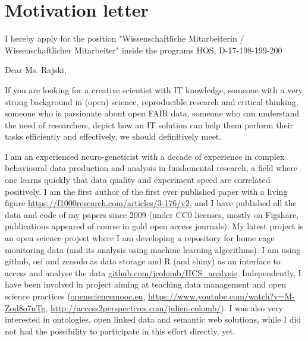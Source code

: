 \section* {Motivation letter}

I hereby apply for the position "Wissenschaftliche Mitarbeiterin / Wissenschaftlicher Mitarbeiter" inside the programs HOS, D-17-198-199-200
\vspace {0.5cm} 

Dear Ms. Rajski,

If you are looking for a creative scientist with IT knowledge, someone with a very strong background in (open) science, reproducible research and critical thinking, someone who is passionate about open FAIR data, someone who can understand the need of researchers, depict how an IT solution can help them perform their tasks efficiently and effectively, we should definitively meet.

I am an experienced neuro-geneticist with a decade of experience in complex behavioural data production and analysis in fundamental research, a field where one learns quickly that data quality and experiment speed are correlated positively. I am the first author of the first ever published paper with a living figure \url{https://f1000research.com/articles/3-176/v2}, and I have published all the data and code of my papers since 2009 (under CC0 licenses, mostly on Figshare, publications appeared of course in gold open access journals). My latest project is an open science project where I am developing a repository for home cage monitoring data (and its analysis using machine learning algorithms). I am using github, osf and zenodo as data storage and R (and shiny) as an interface to access and analyse the data \url{github.com/jcolomb/HCS_analysis}. Independently, I have been involved in project aiming at teaching data management and open science practices (\url{opensciencemooc.eu}, \url{https://www.youtube.com/watch?v=M-Zod8o7nTg}, \url{http://access2perspectives.com/julien-colomb/}). I was also very interested in ontologies, open linked data and semantic web solutions, while I did not had the possibility to participate in this effort directly, yet.

